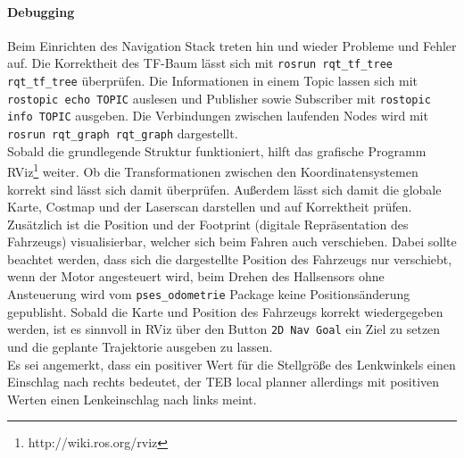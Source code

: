 \paragraph{Debugging}
Beim Einrichten des Navigation Stack treten hin und wieder Probleme und Fehler auf. Die Korrektheit des TF-Baum l\"asst sich mit \texttt{rosrun rqt\_tf\_tree rqt\_tf\_tree} \"uberpr\"ufen. Die Informationen in einem Topic lassen sich mit \texttt{rostopic echo TOPIC} auslesen und Publisher sowie Subscriber mit \texttt{rostopic info TOPIC} ausgeben. Die Verbindungen zwischen laufenden Nodes wird mit \texttt{rosrun rqt\_graph rqt\_graph} dargestellt.\\
Sobald die grundlegende Struktur funktioniert, hilft das grafische Programm RViz\footnote{http://wiki.ros.org/rviz} weiter. Ob die Transformationen zwischen den Koordinatensystemen korrekt sind l\"asst sich damit \"uberpr\"ufen. Au\ss{}erdem l\"asst sich damit die globale Karte, Costmap und der Laserscan darstellen und auf Korrektheit pr\"ufen. Zus\"atzlich ist die Position und der Footprint (digitale Repr\"asentation des Fahrzeugs) visualisierbar, welcher sich beim Fahren auch verschieben. Dabei sollte beachtet werden, dass sich die dargestellte Position des Fahrzeugs nur verschiebt, wenn der Motor angesteuert wird, beim Drehen des Hallsensors ohne Ansteuerung wird vom \texttt{pses\_odometrie} Package keine Positions\"anderung gepublisht. Sobald die Karte und Position des Fahrzeugs korrekt wiedergegeben werden, ist es sinnvoll in RViz \"uber den Button \texttt{2D Nav Goal} ein Ziel zu setzen und die geplante Trajektorie ausgeben zu lassen.\\
Es sei angemerkt, dass ein positiver Wert f\"ur die Stellgr\"o\ss{}e des Lenkwinkels einen Einschlag nach rechts bedeutet, der TEB local planner allerdings mit positiven Werten einen Lenkeinschlag nach links meint.

